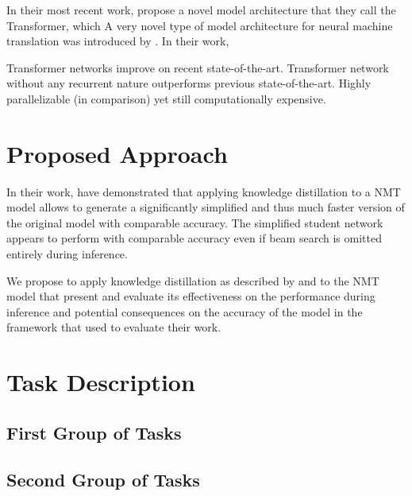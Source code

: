 \documentclass[english]{uzhpub}
\begin{document}
In their most recent work, \cite{attentionisallyouneed} propose a novel model architecture that they call the Transformer, which 
A very novel type of model architecture for neural machine translation was introduced by \cite{attentionisallyouneed}. In their work, \cite{attentionisallyouneed}  

Transformer networks improve on recent state-of-the-art. Transformer network without any recurrent nature outperforms previous state-of-the-art. Highly parallelizable (in comparison) yet still computationally expensive.





\section{Proposed Approach}
In their work, \cite{kim2016sequence} have demonstrated that applying knowledge distillation to a NMT model allows to generate a significantly simplified and thus much faster version of the original model with comparable accuracy.
The simplified student network appears to perform with comparable accuracy even if beam search is omitted entirely during inference.

We propose to apply knowledge distillation as described by \cite{hinton2015distilling} and \cite{kim2016sequence} to the NMT model that \cite{youmaynotneedattention} present and evaluate its effectiveness on the performance during inference and potential consequences on the accuracy of the model in the framework that \cite{youmaynotneedattention} used to evaluate their work.

\section{Task Description}

\subsection{First Group of Tasks}
\subsection{Second Group of Tasks}
\end{document}
